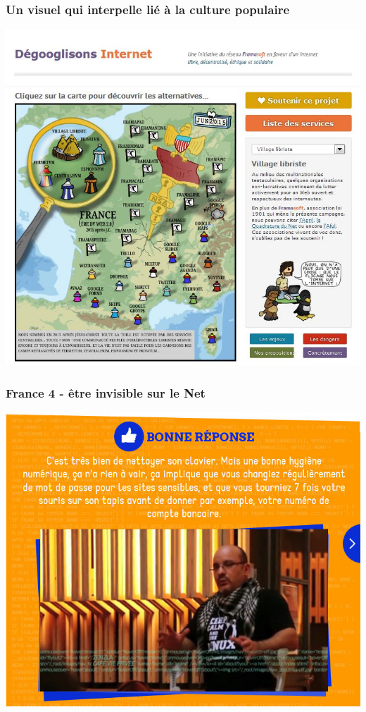 \documentclass{beamer}
\begin{document}
\begin{frame}
\frametitle{Un visuel qui interpelle lié à la culture populaire}
\begin{center}
\includegraphics[scale=0.6] {./images/framasoft_degogglisons.jpg}
\end{center}
\end{frame}

\begin{frame}
\frametitle{France 4 - être invisible sur le Net}
\begin{center}
\includegraphics[scale=0.5] {./images/Quizz_HygieneNumerique_France4_7.jpg}
\end{center}
\end{frame}
\end{document}
